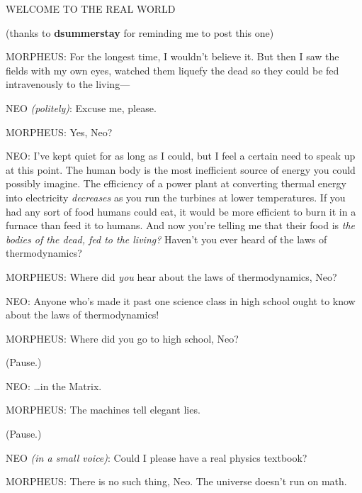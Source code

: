 WELCOME TO THE REAL WORLD

(thanks to \textbf{dsummerstay} for reminding me to post this one)

MORPHEUS: For the longest time, I wouldn't believe it. But then I saw
the fields with my own eyes, watched them liquefy the dead so they could
be fed intravenously to the living---

NEO \emph{(politely)}: Excuse me, please.

MORPHEUS: Yes, Neo?

NEO: I've kept quiet for as long as I could, but I feel a certain need
to speak up at this point. The human body is the most inefficient source
of energy you could possibly imagine. The efficiency of a power plant at
converting thermal energy into electricity \emph{decreases} as you run
the turbines at lower temperatures. If you had any sort of food humans
could eat, it would be more efficient to burn it in a furnace than feed
it to humans. And now you're telling me that their food is \emph{the
bodies of the dead, fed to the living?} Haven't you ever heard of the
laws of thermodynamics?

MORPHEUS: Where did \emph{you} hear about the laws of thermodynamics,
Neo?

NEO: Anyone who's made it past one science class in high school ought to
know about the laws of thermodynamics!

MORPHEUS: Where did you go to high school, Neo?

(Pause.)

NEO: \ldots{}in the Matrix.

MORPHEUS: The machines tell elegant lies.

(Pause.)

NEO \emph{(in a small voice)}: Could I please have a real physics
textbook?

MORPHEUS: There is no such thing, Neo. The universe doesn't run on math.

